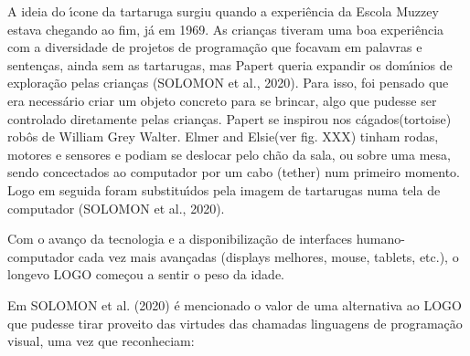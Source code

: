 \documentclass[
12pt,		%
openright,	%
twoside,  %
a4paper,			%
chapter=TITLE,		%
english,			%
french,				%
spanish,			%
brazil				%
]{USPSC-classe/USPSC}
\begin{document}
A ideia do \'{\i}cone da tartaruga surgiu quando a experi\^encia da Escola Muzzey estava chegando ao fim, j\'a em 1969. As crian\c{c}as tiveram uma boa experi\^encia com a diversidade de projetos de programa\c{c}\~ao que focavam em palavras e senten\c{c}as, ainda sem as tartarugas, mas Papert queria expandir os dom\'{\i}nios de explora\c{c}\~ao pelas crian\c{c}as  (SOLOMON et al., 2020). Para isso, foi pensado que era necess\'ario criar um objeto concreto para se brincar, algo que pudesse ser controlado diretamente pelas crian\c{c}as. Papert se inspirou nos \textquotedbl c\'agados\textquotedbl   (tortoise) rob\^os de William Grey Walter. \textquotedbl Elmer and Elsie\textquotedbl  (ver fig. XXX) tinham rodas, motores e sensores e podiam se deslocar pelo ch\~ao da sala, ou sobre uma mesa, sendo concectados ao computador por um cabo (tether) num primeiro momento. Logo em seguida foram substitu\'{\i}dos pela imagem de tartarugas numa tela de computador (SOLOMON et al., 2020).

















Com o avan\c{c}o da tecnologia e a disponibiliza\c{c}\~ao de interfaces humano-computador cada vez mais avan\c{c}adas (displays melhores, mouse, tablets, etc.), o longevo LOGO come\c{c}ou a sentir o peso da idade.

















Em SOLOMON et al. (2020) \'e mencionado o valor de uma alternativa ao LOGO que pudesse tirar proveito das virtudes das chamadas \textquotedbl linguagens de programa\c{c}\~ao visual\textquotedbl , uma vez que reconheciam:


















\noindent\begin{center}\mbox{\centering{}}\end{center}
\end{document}
